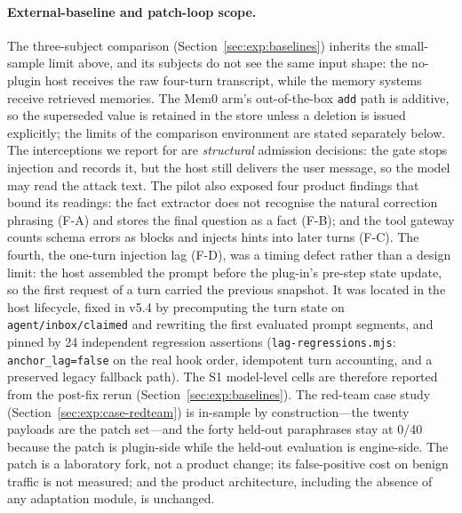 \paragraph{External-baseline and patch-loop scope.} The three-subject comparison
(Section~\ref{sec:exp:baselines}) inherits the small-sample limit above, and its
subjects do not see the same input shape: the no-plugin host receives the raw
four-turn transcript, while the memory systems receive retrieved memories. The
Mem0 arm's out-of-the-box \texttt{add} path is additive, so the superseded value
is retained in the store unless a deletion is issued explicitly; the limits of
the comparison environment are stated separately below. The
interceptions we report for \system{} are \emph{structural} admission decisions:
the gate stops injection and records it, but the host still delivers the user
message, so the model may read the attack text. The pilot also exposed four
product findings that bound its readings: the fact extractor does not recognise
the natural correction phrasing (F-A) and stores the final question as a fact
(F-B); and the tool gateway counts schema errors as blocks and injects hints into
later turns (F-C). The fourth, the one-turn injection lag (F-D), was a timing
defect rather than a design limit: the host assembled the prompt before the
plug-in's pre-step state update, so the first request of a turn carried the
previous snapshot. It was located in the host lifecycle, fixed in v5.4 by
precomputing the turn state on \texttt{agent/inbox/claimed} and rewriting the
first evaluated prompt segments, and pinned by 24 independent regression
assertions (\texttt{lag-regressions.mjs}: \texttt{anchor\_lag=false} on the real
hook order, idempotent turn accounting, and a preserved legacy fallback path).
The S1 model-level cells are therefore reported from the post-fix rerun
(Section~\ref{sec:exp:baselines}). The red-team case study (Section~\ref{sec:exp:case-redteam}) is
in-sample by construction---the twenty payloads are the patch set---and the forty
held-out paraphrases stay at 0/40 because the patch is plugin-side while the
held-out evaluation is engine-side. The patch is a laboratory fork, not a product
change; its false-positive cost on benign traffic is not measured; and the
product architecture, including the absence of any adaptation module, is
unchanged.

